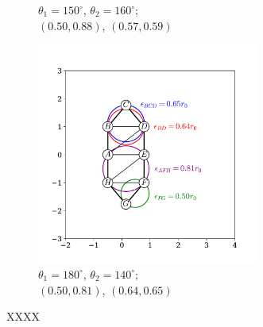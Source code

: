 \begin{figure}[tb]
\begin{subfigure}[b]{0.32\textwidth}
         \caption{$\theta_1=150^\circ$, $\theta_2=160^\circ$; \\$\left(0.50,0.88\right)$, $\left(0.57,0.59\right)$}
         \label{fig:sloct}
     \end{subfigure}
      \hfill
     \begin{subfigure}[b]{0.32\textwidth}
         \centering
         \includegraphics[width=0.8\textwidth]{./figures/ph/sl_oct_b2_c.pdf}
         \caption{$\theta_1=180^\circ$, $\theta_2=140^\circ$; \\$\left(0.50,0.81\right)$, $\left(0.64,0.65\right)$}
         \label{fig:sloct}
     \end{subfigure}

	\caption{XXXX}
	\label{fig:}
\end{figure}





